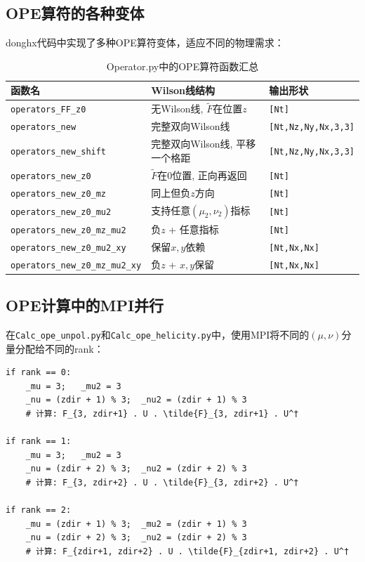 \documentclass[12pt,a4paper]{ctexart}
\begin{document}
\subsection{OPE算符的各种变体}

donghx代码中实现了多种OPE算符变体，适应不同的物理需求：

\begin{table}[htbp]
\centering
\caption{Operator.py中的OPE算符函数汇总}
\label{tab:ope_functions}
\begin{tabular}{@{}lll@{}}
\toprule
\textbf{函数名} & \textbf{Wilson线结构} & \textbf{输出形状} \\
\midrule
\texttt{operators\_FF\_z0} & 无Wilson线, $\tilde{F}$在位置$z$ & \texttt{[Nt]} \\
\texttt{operators\_new} & 完整双向Wilson线 & \texttt{[Nt,Nz,Ny,Nx,3,3]} \\
\texttt{operators\_new\_shift} & 完整双向Wilson线, 平移一个格距 & \texttt{[Nt,Nz,Ny,Nx,3,3]} \\
\texttt{operators\_new\_z0} & $\tilde{F}$在0位置, 正向再返回 & \texttt{[Nt]} \\
\texttt{operators\_new\_z0\_mz} & 同上但负$z$方向 & \texttt{[Nt]} \\
\texttt{operators\_new\_z0\_mu2} & 支持任意$(\mu_2,\nu_2)$指标 & \texttt{[Nt]} \\
\texttt{operators\_new\_z0\_mz\_mu2} & 负$z$ + 任意指标 & \texttt{[Nt]} \\
\texttt{operators\_new\_z0\_mu2\_xy} & 保留$x,y$依赖 & \texttt{[Nt,Nx,Nx]} \\
\texttt{operators\_new\_z0\_mz\_mu2\_xy} & 负$z$ + $x,y$保留 & \texttt{[Nt,Nx,Nx]} \\
\bottomrule
\end{tabular}
\end{table}

\subsection{OPE计算中的MPI并行}

在\texttt{Calc\_ope\_unpol.py}和\texttt{Calc\_ope\_helicity.py}中，使用MPI将不同的$(\mu,\nu)$分量分配给不同的rank：

\begin{codebox}
\begin{lstlisting}[style=pythonstyle]
if rank == 0:
    _mu = 3;   _mu2 = 3
    _nu = (zdir + 1) % 3;  _nu2 = (zdir + 1) % 3
    # 计算: F_{3, zdir+1} . U . \tilde{F}_{3, zdir+1} . U^†

if rank == 1:
    _mu = 3;   _mu2 = 3
    _nu = (zdir + 2) % 3;  _nu2 = (zdir + 2) % 3
    # 计算: F_{3, zdir+2} . U . \tilde{F}_{3, zdir+2} . U^†

if rank == 2:
    _mu = (zdir + 1) % 3;  _mu2 = (zdir + 1) % 3
    _nu = (zdir + 2) % 3;  _nu2 = (zdir + 2) % 3
    # 计算: F_{zdir+1, zdir+2} . U . \tilde{F}_{zdir+1, zdir+2} . U^†
\end{lstlisting}
\end{codebox}
\end{document}
